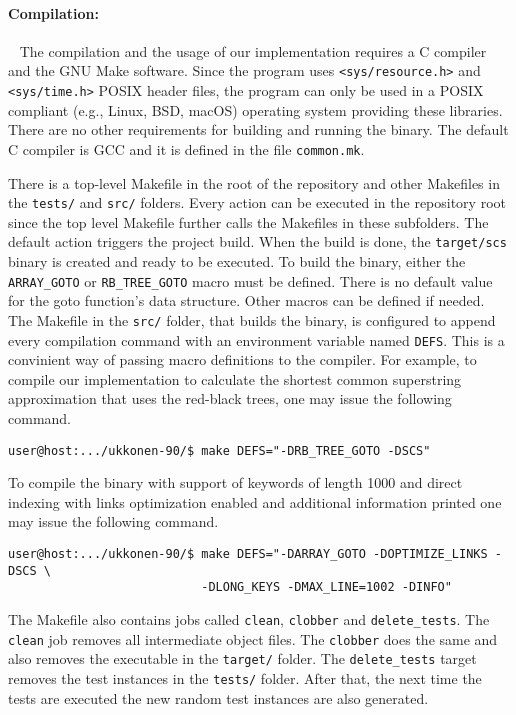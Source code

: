 \documentclass[english,twoside,censored,csm,algorithms-track-2020]{HYthesisML}
\theoremstyle{plain}
\theoremstyle{definition}
\numberwithin{testexample}{chapter}
\begin{document}

\paragraph{Compilation:}~\label{usage}
The compilation and the usage of our implementation requires a C compiler and the GNU Make software.
Since the program uses \texttt{<sys/resource.h>} and \texttt{<sys/time.h>} POSIX header files,
the program can only
be used in a POSIX compliant (e.g., Linux, BSD, macOS) operating system providing these libraries.
There are no other
requirements for building and running the binary. The default C compiler is GCC and it is defined in the
file \texttt{common.mk}.

There is a top-level Makefile in the root of the repository and other Makefiles in the \texttt{tests/}
and \texttt{src/} folders. Every action can be executed in the repository root since the top level
Makefile further calls the Makefiles in these subfolders. The default action triggers the project build.
When the build is done, the \texttt{target/scs} binary is created and ready to be executed. To build
the binary, either the \texttt{ARRAY\_GOTO} or \texttt{RB\_TREE\_GOTO} macro must be defined.
There is no default value
for the goto function's data structure. Other macros can be defined if needed.
The Makefile in the \texttt{src/} folder, that builds the binary, is configured to append every
compilation command with an environment variable named \texttt{DEFS}. This is a convinient way of passing
macro definitions to the compiler. For example, to compile our implementation to calculate the
shortest common superstring approximation that uses the red-black trees, one may issue the following
command.

\begin{verbatim}
user@host:.../ukkonen-90/$ make DEFS="-DRB_TREE_GOTO -DSCS"
\end{verbatim}

To compile the binary with support of keywords of length 1000 and direct indexing with links
optimization enabled and additional information printed one may issue the following command.

\begin{verbatim}
user@host:.../ukkonen-90/$ make DEFS="-DARRAY_GOTO -DOPTIMIZE_LINKS -DSCS \
                           -DLONG_KEYS -DMAX_LINE=1002 -DINFO"
\end{verbatim}

The Makefile also contains jobs called \texttt{clean}, \texttt{clobber} and \texttt{delete\_tests}.
The \texttt{clean} job removes all
intermediate object files. The \texttt{clobber} does the same and also removes the executable in the
\texttt{target/} folder. The \texttt{delete\_tests} target removes the test instances in the
\texttt{tests/}
folder. After that, the next time the tests are executed the new random test instances are
also generated.
\end{document}
